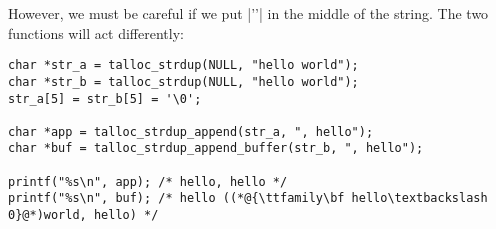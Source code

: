 However, we must be careful if we put |'\0'| in the middle of the string. The
two functions will act differently:

\begin{lstlisting}[caption={Zero in the middle of a string}]
char *str_a = talloc_strdup(NULL, "hello world");
char *str_b = talloc_strdup(NULL, "hello world");
str_a[5] = str_b[5] = '\0';

char *app = talloc_strdup_append(str_a, ", hello");
char *buf = talloc_strdup_append_buffer(str_b, ", hello");

printf("%s\n", app); /* hello, hello */
printf("%s\n", buf); /* hello ((*@{\ttfamily\bf hello\textbackslash 0}@*)world, hello) */
\end{lstlisting}
